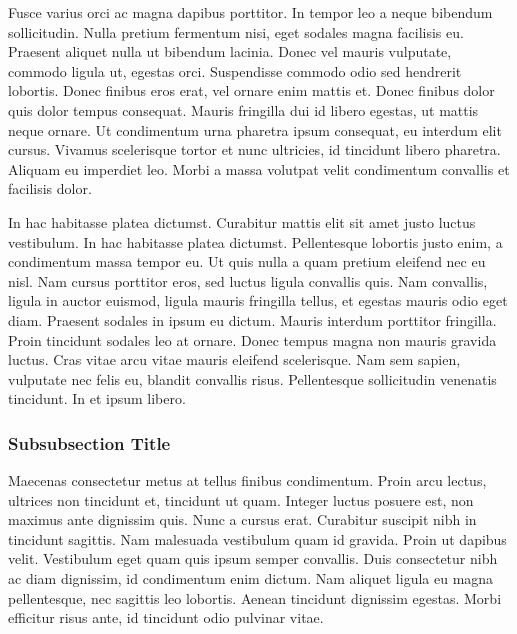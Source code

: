 \documentclass[
	11pt,
	fleqn,
	a4paper,
]{LegrandOrangeBook}
\begin{document}
Fusce varius orci ac magna dapibus porttitor. In tempor leo a neque bibendum sollicitudin. Nulla pretium fermentum nisi, eget sodales magna facilisis eu. Praesent aliquet nulla ut bibendum lacinia. Donec vel mauris vulputate, commodo ligula ut, egestas orci. Suspendisse commodo odio sed hendrerit lobortis. Donec finibus eros erat, vel ornare enim mattis et. Donec finibus dolor quis dolor tempus consequat. Mauris fringilla dui id libero egestas, ut mattis neque ornare. Ut condimentum urna pharetra ipsum consequat, eu interdum elit cursus. Vivamus scelerisque tortor et nunc ultricies, id tincidunt libero pharetra. Aliquam eu imperdiet leo. Morbi a massa volutpat velit condimentum convallis et facilisis dolor.

In hac habitasse platea dictumst. Curabitur mattis elit sit amet justo luctus vestibulum. In hac habitasse platea dictumst. Pellentesque lobortis justo enim, a condimentum massa tempor eu. Ut quis nulla a quam pretium eleifend nec eu nisl. Nam cursus porttitor eros, sed luctus ligula convallis quis. Nam convallis, ligula in auctor euismod, ligula mauris fringilla tellus, et egestas mauris odio eget diam. Praesent sodales in ipsum eu dictum. Mauris interdum porttitor fringilla. Proin tincidunt sodales leo at ornare. Donec tempus magna non mauris gravida luctus. Cras vitae arcu vitae mauris eleifend scelerisque. Nam sem sapien, vulputate nec felis eu, blandit convallis risus. Pellentesque sollicitudin venenatis tincidunt. In et ipsum libero.

\subsubsection{Subsubsection Title} 

Maecenas consectetur metus at tellus finibus condimentum. Proin arcu lectus, ultrices non tincidunt et, tincidunt ut quam. Integer luctus posuere est, non maximus ante dignissim quis. Nunc a cursus erat. Curabitur suscipit nibh in tincidunt sagittis. Nam malesuada vestibulum quam id gravida. Proin ut dapibus velit. Vestibulum eget quam quis ipsum semper convallis. Duis consectetur nibh ac diam dignissim, id condimentum enim dictum. Nam aliquet ligula eu magna pellentesque, nec sagittis leo lobortis. Aenean tincidunt dignissim egestas. Morbi efficitur risus ante, id tincidunt odio pulvinar vitae.
\end{document}
